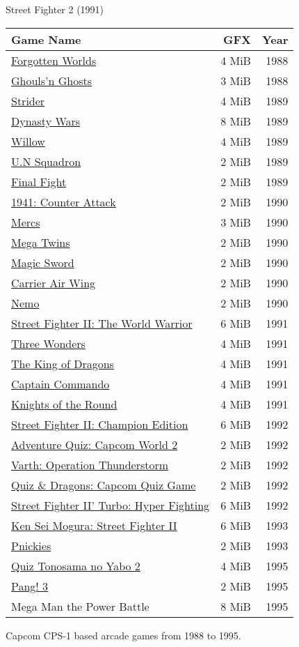 \label{nin_sf2}
\begin{figure}[H]
\caption*{Street Fighter 2 (1991)}
\end{figure}

\begin{figure}[H]
{ \setlength{\tabcolsep}{3.0pt}
\begin{tabularx}{\textwidth}{Xrr} 
  \textbf{Game Name} & \textbf{ GFX }  & \textbf{ Year } \\               
  \toprule    
\href{}{Forgotten Worlds} & 4 MiB & 1988 \\ 
\href{}{Ghouls'n Ghosts} & 3 MiB & 1988 \\ 
  \toprule    
\href{}{Strider} & 4 MiB & 1989 \\ 
\href{}{Dynasty Wars} & 8 MiB & 1989 \\ 
\href{}{Willow} & 4 MiB & 1989 \\ 
\href{}{U.N Squadron} & 2 MiB & 1989 \\ 
\href{}{Final Fight} & 2 MiB & 1989 \\ 
  \toprule    
\href{}{1941: Counter Attack} & 2 MiB &  1990 \\ 
\href{}{Mercs} &  3 MiB & 1990 \\ 
\href{}{Mega Twins} & 2 MiB & 1990 \\ 
\href{}{Magic Sword} & 2 MiB & 1990 \\ 
\href{}{Carrier Air Wing} & 2 MiB  & 1990 \\ 
\href{}{Nemo} & 2 MiB &  1990 \\ 
  \toprule    
\href{}{Street Fighter II: The World Warrior} & 6 MiB & 1991 \\ 
\href{}{Three Wonders} & 4 MiB & 1991 \\ 
\href{}{The King of Dragons} & 4 MiB & 1991 \\ 
\href{}{Captain Commando} &  4 MiB & 1991 \\ 
\href{}{Knights of the Round} & 4 MiB  & 1991 \\ 
  \toprule    
\href{}{Street Fighter II: Champion Edition} & 6 MiB & 1992 \\ 
\href{}{Adventure Quiz: Capcom World 2} & 2 MiB & 1992 \\ 
\href{}{Varth: Operation Thunderstorm} & 2 MiB & 1992 \\ 
\href{}{Quiz \& Dragons: Capcom Quiz Game} & 2 MiB & 1992 \\ 
\href{}{Street Fighter II' Turbo: Hyper Fighting} &  6 MiB & 1992 \\ 
  \toprule    
\href{}{Ken Sei Mogura: Street Fighter II} & 6 MiB & 1993 \\ 
\href{}{Pnickies} & 2 MiB & 1993 \\ 
  \toprule    
\href{}{Quiz Tonosama no Yabo 2} &  4 MiB & 1995 \\ 
\href{}{Pang! 3} & 2 MiB  & 1995 \\ 
Mega Man the Power Battle & 8 MiB  & 1995 \\

\toprule    
\end{tabularx}%
}\caption*{Capcom CPS-1 based arcade games from 1988 to 1995.}
\end{figure}




